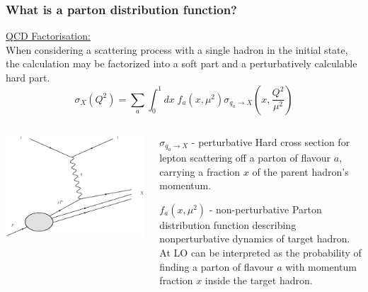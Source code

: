 \documentclass[10pt]{beamer}
\newcommand{\be}{\begin{equation*}}
\newcommand{\ee}{\end{equation*}}
\begin{document}
\begin{frame}
\frametitle{What is a parton distribution function?}
\small \underline{QCD Factorisation:} \\
When considering a scattering process with a single hadron in the initial state, the calculation may be factorized into a soft part and a perturbatively calculable hard part.
\be \sigma_X(Q^2)= \sum_{a} \int_0^1 dx\; f_a(x,\mu^2)\sigma_{q_a \to X} \left( x,\frac{Q^2}{\mu^2} \right) \ee

\begin{columns}
\begin{column}{0.5\textwidth}
\includegraphics[width=\textwidth]{figures/DIS.eps}
\end{column}

	\begin{column}{0.5\textwidth}
	\begin{block}{\small $\sigma_{q_a \to X} $ - perturbative}
	\footnotesize Hard cross section for lepton scattering off a parton of flavour $a$, carrying a fraction $x$ of the parent hadron's momentum.
	\end{block}
	
	\begin{block}{\small $f_a(x,\mu^2) $ - non-perturbative}
		\footnotesize Parton distribution function describing nonperturbative dynamics of target hadron. At LO can be interpreted as the probability of finding a parton of flavour
		$a$ with momentum fraction $x$ inside the target hadron.
	\end{block}

	\end{column}
\end{columns}
\end{frame}
\end{document}
